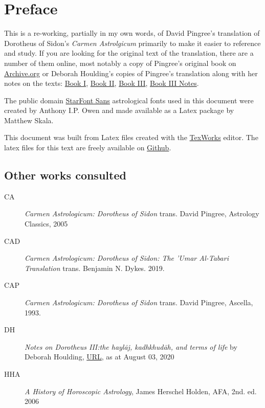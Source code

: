 \chapter{Preface}
This is a re-working, partially in my own words, of David Pingree's translation of Dorotheus of Sidon's \textsl{Carmen Astrolgicum} primarily to make it easier to reference and study. If you are looking for the original text of the translation, there are a number of them online, most notably a copy of Pingree's original book on \href{https://archive.org/details/PingreeDS1976}{Archive.org} or Deborah Houlding's copies of Pingree's translation along with her notes on the texts: \href{https://www.skyscript.co.uk/dorotheus1.pdf}{Book I}, \href{https://www.skyscript.co.uk/dorotheus2.pdf}{Book II}, \href{https://www.skyscript.co.uk/dorotheus3.pdf}{Book III}, \href{https://www.skyscript.co.uk/dorotheus3notes.pdf}{Book III Notes}.

The public domain \href{https://www.ctan.org/pkg/starfont}{StarFont Sans} astrological fonts used in this document were created by Anthony I.P. Owen and made available as a Latex package by Matthew Skala. 

This document was built from Latex files created with the \href{https://www.tug.org/texworks/}{TexWorks} editor. The latex files for this text are freely available on \href{https://github.com/janegca/latex-dorotheus}{Github}.

\section{Other works consulted}
\begin{description}
\item[CA]
	\textsl{Carmen Astrologicum: Dorotheus of Sidon} trans. David Pingree, Astrology Classics, 2005

\item[CAD]
	\textsl{Carmen Astrologicum: Dorotheus of Sidon: The 'Umar Al-Tabari Translation} trans. Benjamin N. Dykes. 2019.

\item[CAP]
	\textsl{Carmen Astrologicum: Dorotheus of Sidon} trans. David Pingree, Ascella, 1993.
	
\item[DH]
	\textsl{Notes on Dorotheus III:the haylāj, kadhkhudāh, and terms of life} by Deborah Houlding, \href{https://www.skyscript.co.uk/dorotheus3notes.pdf}{URL}, as at August 03, 2020
	
\item[HHA]
	\textsl{A History of Horoscopic Astrology}, James Herschel Holden, AFA, 2nd. ed. 2006
\end{description}

